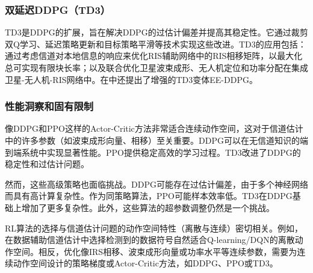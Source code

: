 \documentclass[journal]{IEEEtran}
\begin{document}
\subsubsection{双延迟DDPG（TD3）}
TD3是DDPG的扩展，旨在解决DDPG的过估计偏差并提高其稳定性。它通过裁剪双Q学习、延迟策略更新和目标策略平滑等技术实现这些改进\cite{ref7}。TD3的应用包括：通过考虑信道对本地信息的响应来优化RIS辅助网络中的RIS相移矩阵，以最大化总可实现有限块长率\cite{ref7}；以及联合优化卫星波束成形、无人机定位和功率分配在集成卫星-无人机-RIS网络中\cite{ref30}。在\cite{ref21}中还提出了增强的TD3变体EE-DDPG。

\subsubsection{性能洞察和固有限制}
像DDPG和PPO这样的Actor-Critic方法非常适合连续动作空间，这对于信道估计中的许多参数（如波束成形向量、相移）至关重要\cite{ref1}。DDPG可以在无信道知识的端到端系统中实现显著性能\cite{ref10}。PPO提供稳定高效的学习过程\cite{ref16}。TD3改进了DDPG的稳定性和过估计问题\cite{ref7}。

然而，这些高级策略也面临挑战。DDPG可能存在过估计偏差，由于多个神经网络而具有高计算复杂性\cite{ref7}。作为同策略算法，PPO可能样本效率低。TD3在DDPG基础上增加了更多复杂性\cite{ref7}。此外，这些算法的超参数调整仍然是一个挑战\cite{ref19}。

RL算法的选择与信道估计问题的动作空间特性（离散与连续）密切相关。例如，在数据辅助信道估计中选择检测到的数据符号\cite{ref12}自然适合Q-learning/DQN的离散动作空间。相反，优化像IRS相移\cite{ref1}、波束成形向量或功率水平\cite{ref21}等连续参数，需要为连续动作空间设计的策略梯度或Actor-Critic方法，如DDPG、PPO或TD3\cite{ref7}。
\end{document}
